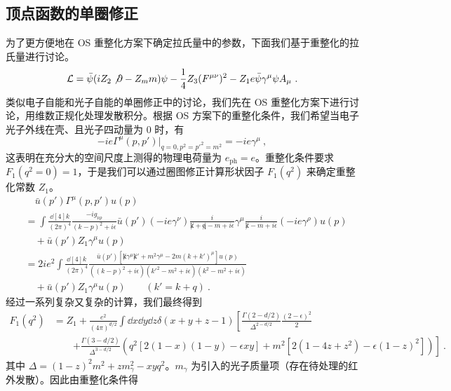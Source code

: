 \subsection{顶点函数的单圈修正}
为了更方便地在 OS 重整化方案下确定拉氏量中的参数，下面我们基于重整化的拉氏量进行讨论。
\begin{equation}
\mathcal{L}=\bar\psi (iZ_2\not\partial - Z_m m)\psi - \frac{1}{4}Z_3 (F^{\mu\nu})^2-Z_1 e \bar\psi \gamma^\mu\psi A_\mu~.
\end{equation}
类似电子自能和光子自能的单圈修正中的讨论，我们先在 OS 重整化方案下进行讨论，用维数正规化处理发散积分。根据 OS 方案下的重整化条件，我们希望当电子光子外线在壳、且光子四动量为 $0$ 时，有
\begin{equation}
-ie\Gamma^\mu(p,p')|_{q=0,p^2={p'}^2=m^2} = -ie\gamma^\mu~,
\end{equation}
这表明在充分大的空间尺度上测得的物理电荷量为 $e_{\text{ph}}=e$。重整化条件要求 $F_1(q^2=0)=1$，于是我们可以通过圈图修正计算形状因子 $F_1(q^2)$ 来确定重整化常数 $Z_1$。
\begin{equation}
\begin{aligned}
&\quad\bar u(p')\Gamma^\mu(p,p')u(p)\\
&=\int\frac{\dd[4]{k}}{(2\pi)^4} \frac{-i g_{\nu\rho}}{(k-p)^2+i\epsilon} \bar u(p')(-ie\gamma^\nu)\frac{i}{\not k+\not q-m+i\epsilon}\gamma^\mu \frac{i}{\not k-m+i\epsilon} (-ie\gamma^\rho) u(p)\\
&\quad+\bar u(p')Z_1\gamma^\mu u(p)\\
&=2ie^2\int\frac{\dd[4]{k}}{(2\pi)^4} \frac{\bar u(p') [\not k \gamma^\mu \not k'+m^2\gamma^\mu - 2m(k+k')^\mu]u(p)}{((k-p)^2+i\epsilon)({k'}^2-m^2+i\epsilon)(k^2-m^2+i\epsilon)} \\
&\quad+ \bar u(p') Z_1 \gamma^\mu u(p) \qquad (k' = k+q)~.
\end{aligned}
\end{equation}
经过一系列复杂又复杂的计算，我们最终得到
\begin{equation}
\begin{aligned}
F_1(q^2)&=Z_1 + \frac{e^2}{(4\pi)^{d/2}}\int\dd x\dd y\dd z\delta(x+y+z-1)\left[\frac{\Gamma(2-d/2)}{\Delta^{2-d/2}}\frac{(2-\epsilon)^2}{2}\right.\\
&\quad\quad\left.+\frac{\Gamma(3-d/2)}{\Delta^{3-d/2}}(q^2[2(1-x)(1-y)-\epsilon xy]+m^2[2(1-4z+z^2)-\epsilon(1-z)^2])
\right]~.
\end{aligned}
\end{equation}
其中 $\Delta =(1-z)^2m^2+zm_\gamma^2 - xyq^2$。$m_\gamma$ 为引入的光子质量项（存在待处理的红外发散）。因此由重整化条件得
